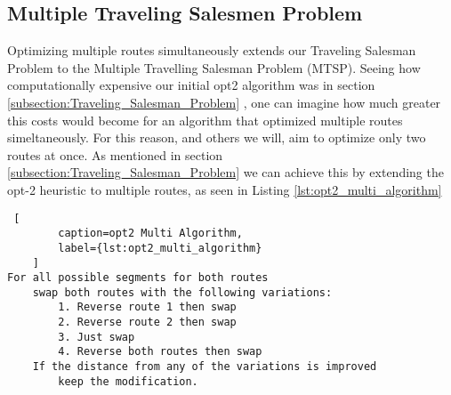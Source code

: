\documentclass[letterpaper]{article}
\begin{document}
\begin{figure}[h]
\begin{minipage}{0.3\linewidth}
        \end{minipage}
    \end{figure}

    \subsection{Multiple Traveling Salesmen Problem}
    \label{subsection:Multiple_Traveling_Salesmen_Problem}
    
    Optimizing multiple routes simultaneously extends our 
    Traveling Salesman Problem to the Multiple Travelling 
    Salesman Problem (MTSP). Seeing how computationally 
    expensive our initial opt2 algorithm was in section 
    \ref{subsection:Traveling_Salesman_Problem} , one can imagine how much greater 
    this costs would become for an algorithm that optimized 
    multiple routes simeltaneously. For this reason, and 
    others we will, aim to optimize only two routes at 
    once. As mentioned in section \ref{subsection:Traveling_Salesman_Problem} we can achieve this 
    by extending the opt-2 heuristic to multiple routes, as seen in Listing \ref{lst:opt2_multi_algorithm}
    
    \begin{lstlisting} [
        caption=opt2 Multi Algorithm,
        label={lst:opt2_multi_algorithm}
    ]
For all possible segments for both routes
    swap both routes with the following variations:
        1. Reverse route 1 then swap
        2. Reverse route 2 then swap
        3. Just swap
        4. Reverse both routes then swap
    If the distance from any of the variations is improved
        keep the modification.\end{lstlisting}
    
\end{document}
